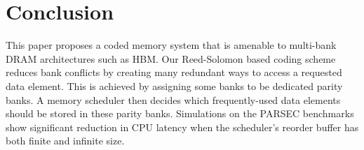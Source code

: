 \section{Conclusion}
\label{sec:conclusion}
This paper proposes a coded memory system that is amenable to multi-bank DRAM architectures such as HBM. Our Reed-Solomon based coding scheme reduces bank conflicts by creating many redundant ways to access a requested data element. This is achieved by assigning some banks to be dedicated parity banks. A memory scheduler then decides which frequently-used data elements should be stored in these parity banks. Simulations on the PARSEC benchmarks show significant reduction in CPU latency when the scheduler's reorder buffer has both finite and infinite size.

%

